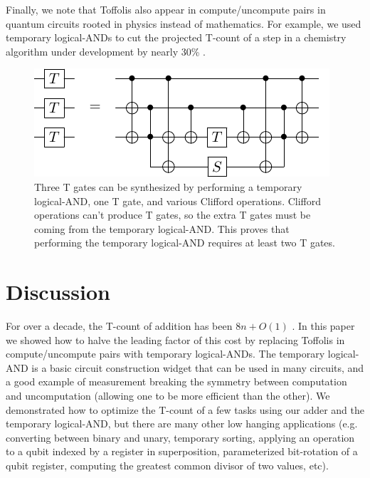 \documentclass[twocolumn]{quantumarticle-customized}
\begin{document}
Finally, we note that Toffolis also appear in compute/uncompute pairs in quantum circuits rooted in physics instead of mathematics.
For example, we used temporary logical-ANDs to cut the projected T-count of a step in a chemistry algorithm under development by nearly 30\% \cite{RyanEmails2017}.

\begin{figure}
  \includegraphics[width=\linewidth]{synthesize-t-gates-from-temporary-logical-and.pdf}
  \caption{
	Three T gates can be synthesized by performing a temporary logical-AND, one T gate, and various Clifford operations.
	Clifford operations can't produce T gates, so the extra T gates must be coming from the temporary logical-AND.
	This proves that performing the temporary logical-AND requires at least two T gates.
  }
  \label{fig:synthesize-t-gates-from-temporary-logical-and}
\end{figure}


\section*{Discussion}

For over a decade, the T-count of addition has been $8n + O(1)$ \cite{Amy2013, Barenco1995, Cuccaro2004}.
In this paper we showed how to halve the leading factor of this cost by replacing Toffolis in compute/uncompute pairs with temporary logical-ANDs.
The temporary logical-AND is a basic circuit construction widget that can be used in many circuits, and a good example of measurement breaking the symmetry between computation and uncomputation (allowing one to be more efficient than the other).
We demonstrated how to optimize the T-count of a few tasks using our adder and the temporary logical-AND, but there are many other low hanging applications (e.g. converting between binary and unary, temporary sorting, applying an operation to a qubit indexed by a register in superposition, parameterized bit-rotation of a qubit register, computing the greatest common divisor of two values, etc).
\end{document}
